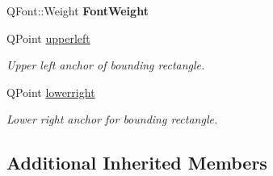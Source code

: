 \begin{DoxyCompactItemize}
\item 
\hypertarget{classText_a557271ec04c6fdc5348bd2b7190744db}{Q\-Font\-::\-Weight {\bfseries Font\-Weight}}\label{classText_a557271ec04c6fdc5348bd2b7190744db}

\item 
\hypertarget{classText_a32e176ed2a90d7267df882653a135d97}{Q\-Point \hyperlink{classText_a32e176ed2a90d7267df882653a135d97}{upperleft}}\label{classText_a32e176ed2a90d7267df882653a135d97}

\begin{DoxyCompactList}\small\item\em Upper left anchor of bounding rectangle. \end{DoxyCompactList}\item 
\hypertarget{classText_a0f21d563e534b5faf41ba11f5ae9316c}{Q\-Point \hyperlink{classText_a0f21d563e534b5faf41ba11f5ae9316c}{lowerright}}\label{classText_a0f21d563e534b5faf41ba11f5ae9316c}

\begin{DoxyCompactList}\small\item\em Lower right anchor for bounding rectangle. \end{DoxyCompactList}\end{DoxyCompactItemize}
\subsection*{Additional Inherited Members}


